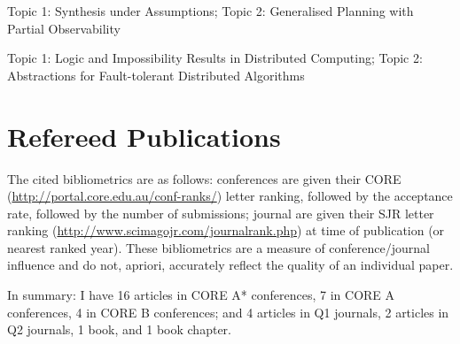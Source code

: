 \documentclass[10pt,a4paper,sans]{moderncv}
\newif\ifmetrics
\begin{document}
{Topic 1: Synthesis under Assumptions;
Topic 2: Generalised Planning with Partial Observability}{}{}{}

{Topic 1: Logic and Impossibility Results in Distributed Computing;
Topic 2: Abstractions for Fault-tolerant Distributed Algorithms}{}{}{}

% 
% 
% 
% 
% 
% 
% 



\newpage
\section{Refereed Publications}

\ifmetrics
The cited bibliometrics are as follows: conferences are given their CORE (\url{http://portal.core.edu.au/conf-ranks/}) letter ranking, followed by the acceptance rate, followed by the number of submissions; journal are given their SJR letter ranking (\url{http://www.scimagojr.com/journalrank.php}) at time of publication (or nearest ranked year). These bibliometrics are a measure of conference/journal influence and do not, apriori, accurately reflect the quality of an individual paper. 

In summary: I have 16 articles in CORE A* conferences, 
7 in CORE A conferences, 4 in CORE B conferences; and 4 articles in Q1 journals, 2 articles in Q2 journals, 1 book, and 1 book chapter.
\end{document}

